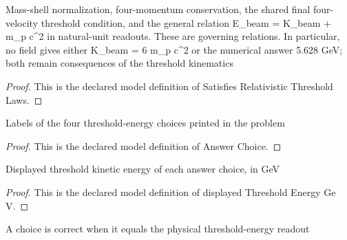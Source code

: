 \begin{definition}
  \label{def:physics:phyx-mini-0555:phyxminiproblems-problemphyxmini0555-satisfiesrelativisticthresholdlaws}
  Mass-shell normalization, four-momentum conservation, the shared final four-velocity threshold condition, and the general relation E\_beam = K\_beam + m\_p c\textasciicircum{}2 in natural-unit readouts. These are governing relations. In particular, no field gives either K\_beam = 6 m\_p c\textasciicircum{}2 or the numerical answer 5.628 GeV; both remain consequences of the threshold kinematics
\end{definition}
\begin{proof}
  This is the declared model definition of Satisfies Relativistic Threshold Laws.
\end{proof}
\begin{definition}
  \label{def:physics:phyx-mini-0555:phyxminiproblems-problemphyxmini0555-answerchoice}
  Labels of the four threshold-energy choices printed in the problem
\end{definition}
\begin{proof}
  This is the declared model definition of Answer Choice.
\end{proof}
\begin{definition}
  \label{def:physics:phyx-mini-0555:phyxminiproblems-problemphyxmini0555-displayedthresholdenergygev}
  Displayed threshold kinetic energy of each answer choice, in GeV
\end{definition}
\begin{proof}
  This is the declared model definition of displayed Threshold Energy Ge V.
\end{proof}
\begin{definition}
  \label{def:physics:phyx-mini-0555:phyxminiproblems-problemphyxmini0555-matchesdisplayedthresholdchoice}
  A choice is correct when it equals the physical threshold-energy readout
\end{definition}
